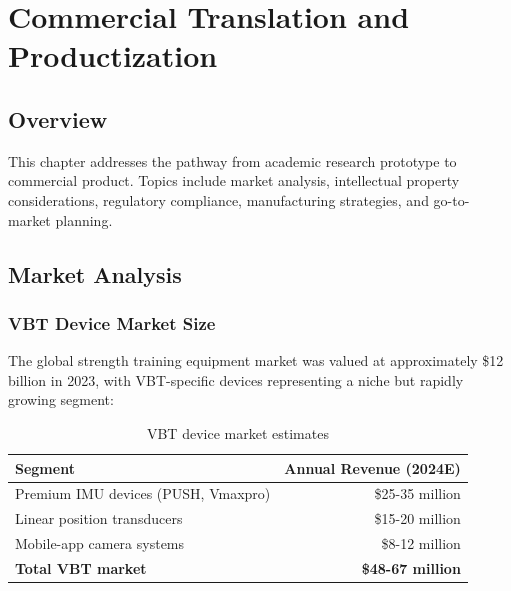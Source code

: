 
\chapter{Commercial Translation and Productization} \label{chap:commercialization}

\section{Overview}

This chapter addresses the pathway from academic research prototype to commercial product. Topics include market analysis, intellectual property considerations, regulatory compliance, manufacturing strategies, and go-to-market planning.

\section{Market Analysis}

\subsection{VBT Device Market Size}

The global strength training equipment market was valued at approximately \$12 billion in 2023, with VBT-specific devices representing a niche but rapidly growing segment:

\begin{table}[h]
    \centering
    \caption{VBT device market estimates}
    \label{tab:market_size}
    \begin{tabular}{lr}
        \toprule
        \textbf{Segment} & \textbf{Annual Revenue (2024E)} \\
        \midrule
        Premium IMU devices (PUSH, Vmaxpro) & \$25-35 million \\
        Linear position transducers & \$15-20 million \\
        Mobile-app camera systems & \$8-12 million \\
        \midrule
        \textbf{Total VBT market} & \textbf{\$48-67 million} \\
        \bottomrule
    \end{tabular}
\end{table}

